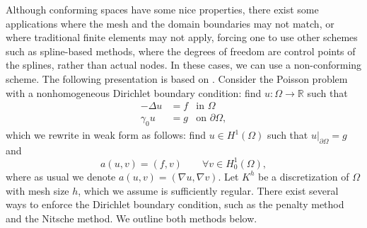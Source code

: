 \documentclass{article}
\newcommand{\tin}{\text{in }}
\newcommand{\ton}{\text{on }}
\begin{document}
Although conforming spaces have some nice properties, there exist some applications where the mesh and the domain boundaries may not match, or where traditional finite elements may not apply, forcing one to use other schemes such as spline-based methods, where the degrees of freedom are control points of the splines, rather than actual nodes. In these cases, we can use a non-conforming scheme. The following presentation is based on \cite{Chouly2024}. Consider the Poisson problem with a nonhomogeneous Dirichlet boundary condition: find $u:\Omega\to \mathbb{R}$ such that
$$
\begin{aligned}
    -\Delta u &= f & \tin \Omega \\
    \gamma_0 u &= g & \ton \partial\Omega,
\end{aligned}
$$
which we rewrite in weak form as follows: find $u\in H^1(\Omega)$ such that $u|_{\partial\Omega} = g$ and
$$a(u,v) = (f,v) \qquad \forall v\in H_0^1(\Omega),$$
where as usual we denote $a(u,v)=(\nabla u,\nabla v)$. Let $K^h$ be a discretization of $\Omega$ with mesh size $h$, which we assume is sufficiently regular. There exist several ways to enforce the Dirichlet boundary condition, such as the penalty method and the Nitsche method. We outline both methods below.
\end{document}
